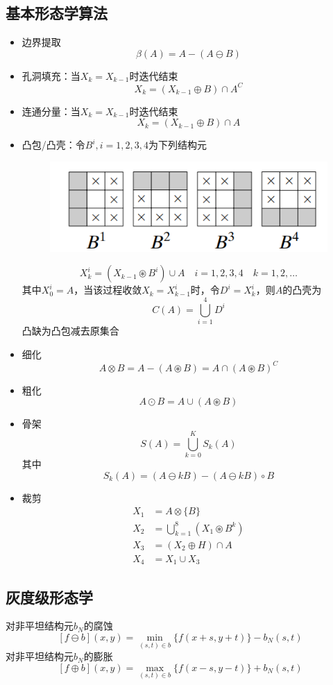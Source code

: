 \subsection{基本形态学算法}
\begin{itemize}
\item 边界提取
\[\beta(A)=A-(A\ominus B)\]
\item 孔洞填充：当$X_k=X_{k-1}$时迭代结束
\[X_k=(X_{k-1}\oplus B)\cap A^C\]
\item 连通分量：当$X_k=X_{k-1}$时迭代结束
\[X_k=(X_{k-1}\oplus B)\cap A\]
\item 凸包/凸壳：令$B^i,i=1,2,3,4$为下列结构元
\begin{figure}[H]
\centering
\includegraphics[width=0.4\linewidth]{fig/convex_hull_SE.png}
\end{figure}
\[X_k^i=(X_{k-1}\circledast B^i)\cup A\quad i=1,2,3,4\quad k=1,2,\ldots\]
其中$X_0^i=A$，当该过程收敛$X_k=X_{k-1}^i$时，令$D^i=X_k^i$，则$A$的凸壳为
\[C(A)=\bigcup_{i=1}^4 D^i\]
凸缺为凸包减去原集合
\item 细化
\[A\otimes B=A-(A\circledast B)=A\cap(A\circledast B)^C\]
\item 粗化
\[A\odot B=A\cup (A\circledast B)\]
\item 骨架
\[S(A)=\bigcup_{k=0}^K S_k(A)\]
其中
\[S_k(A)=(A\ominus kB)-(A\ominus kB)\circ B\]
\item 裁剪
\[\begin{aligned}
X_1&=A\otimes \{B\}\\
X_2&=\bigcup_{k=1}^8(X_1\circledast B^k)\\
X_3&=(X_2\oplus H)\cap A\\
X_4&=X_1\cup X_3
\end{aligned}\]
\end{itemize}

\subsection{灰度级形态学}
\begin{definition}[灰度级腐蚀与膨胀]
对非平坦结构元$b_N$的腐蚀
\[[f\ominus b](x,y)=\min_{(s,t)\in b}\{f(x+s,y+t)\}-b_N(s,t)\]
对非平坦结构元$b_N$的膨胀
\[[f\oplus b](x,y)=\max_{(s,t)\in b}\{f(x-s,y-t)\}+b_N(s,t)\]
\end{definition}


